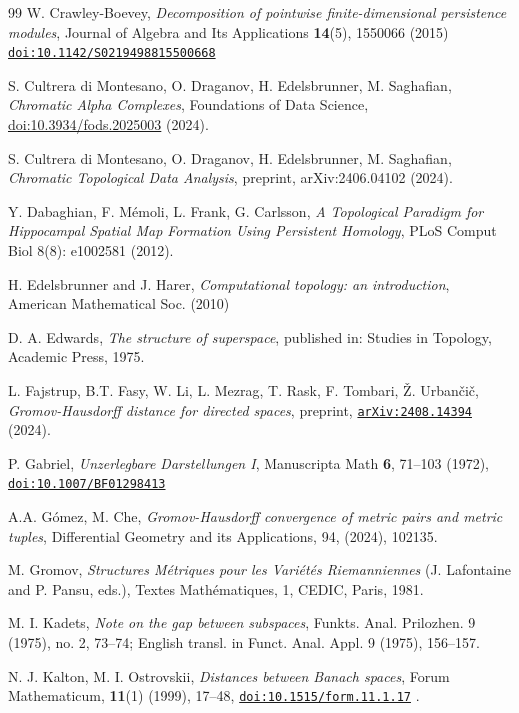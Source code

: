 \documentclass[8pt,a4paper,oneside,english,english]{article}
\theoremstyle{plain}
\theoremstyle
{plain}
\theoremstyle{definition}
\begin{document}
\begin{thebibliography}{99}
W. Crawley-Boevey, {\em Decomposition of pointwise finite-dimensional persistence modules}, Journal of Algebra and Its Applications {\bf 14}(5), 1550066 (2015)
\href{https://doi.org/10.1142/S0219498815500668}{\tt doi:10.1142/S0219498815500668}

S. Cultrera di Montesano, O. Draganov, H. Edelsbrunner, M. Saghafian, {\em Chromatic Alpha Complexes}, Foundations of Data Science, \href{https://doi.org/10.3934/fods.2025003}{doi:10.3934/fods.2025003} (2024).

S. Cultrera di Montesano, O. Draganov, H. Edelsbrunner, M. Saghafian, {\em Chromatic Topological Data Analysis}, preprint, arXiv:2406.04102 (2024).

Y. Dabaghian, F. M\'emoli, L. Frank, G. Carlsson, {\em A Topological Paradigm for Hippocampal Spatial Map Formation Using Persistent Homology}, PLoS Comput Biol 8(8): e1002581 (2012).

H. Edelsbrunner and J. Harer, {\em Computational topology: an introduction}, American Mathematical Soc. (2010)

D. A. Edwards, {\em The structure of superspace}, published in: Studies in Topology, Academic Press, 1975.

L. Fajstrup, B.T. Fasy, W. Li, L. Mezrag, T. Rask, F. Tombari, \v{Z}. Urban\v{c}i\v{c}, {\em Gromov-Hausdorff distance for directed spaces}, preprint, \href{https://arxiv.org/abs/2408.14394}{\tt arXiv:2408.14394} (2024).

P. Gabriel, {\em Unzerlegbare Darstellungen I}, Manuscripta Math {\bf 6}, 71--103 (1972), \href{https://doi.org/10.1007/BF01298413}{\tt doi:10.1007/BF01298413}

A.A. G\'omez, M. Che, {\em Gromov-Hausdorff convergence of metric pairs and metric tuples}, Differential Geometry and its Applications, 94, (2024), 102135.

M. Gromov, {\em Structures M\'etriques pour les Vari\'et\'es Riemanniennes} (J. Lafontaine and P. Pansu, eds.), Textes Math\'ematiques, 1, CEDIC, Paris, 1981.

M. I. Kadets, {\em Note on the gap between subspaces}, Funkts. Anal. Prilozhen. 9 (1975), no. 2, 73--74; English transl. in Funct. Anal. Appl. 9 (1975), 156--157.

N. J. Kalton, M. I. Ostrovskii, {\em Distances between Banach spaces}, Forum Mathematicum, {\bf 11}(1) (1999), 17--48, \href{https://doi.org/10.1515/form.11.1.17}{\tt doi:10.1515/form.11.1.17} .


\end{thebibliography}
\end{document}
